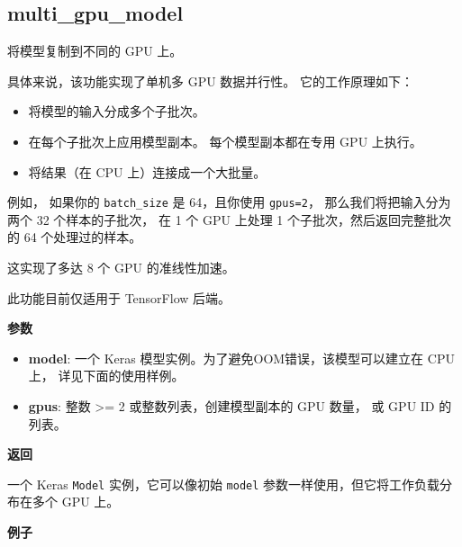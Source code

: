 \subsection{multi\_gpu\_model}\label{multi-gpu-model}

\begin{Shaded}
\begin{Highlighting}[]
\end{Highlighting}
\end{Shaded}

将模型复制到不同的 GPU 上。

具体来说，该功能实现了单机多 GPU 数据并行性。 它的工作原理如下：

\begin{itemize}
\tightlist
\item
  将模型的输入分成多个子批次。
\item
  在每个子批次上应用模型副本。 每个模型副本都在专用 GPU 上执行。
\item
  将结果（在 CPU 上）连接成一个大批量。
\end{itemize}

例如， 如果你的 \texttt{batch\_size} 是 64，且你使用 \texttt{gpus=2}，
那么我们将把输入分为两个 32 个样本的子批次， 在 1 个 GPU 上处理 1
个子批次，然后返回完整批次的 64 个处理过的样本。

这实现了多达 8 个 GPU 的准线性加速。

此功能目前仅适用于 TensorFlow 后端。

\textbf{参数}

\begin{itemize}
\tightlist
\item
  \textbf{model}: 一个 Keras 模型实例。为了避免OOM错误，该模型可以建立在
  CPU 上， 详见下面的使用样例。
\item
  \textbf{gpus}: 整数 \textgreater{}= 2 或整数列表，创建模型副本的 GPU
  数量， 或 GPU ID 的列表。
\end{itemize}

\textbf{返回}

一个 Keras \texttt{Model} 实例，它可以像初始 \texttt{model}
参数一样使用，但它将工作负载分布在多个 GPU 上。

\textbf{例子}


